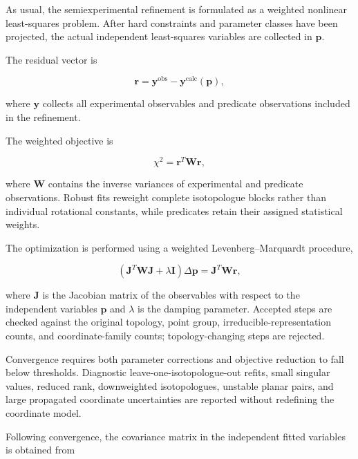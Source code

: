 \documentclass[aip,jcp,reprint,longbibliography,floatfix]{revtex4-2}
\begin{document}
As usual,\cite{Demaison2011EquilibriumStructures,Mendolicchio2017MSR} the semiexperimental
refinement is formulated as a weighted nonlinear least-squares problem.
After hard constraints and parameter classes have been projected, the actual independent
least-squares variables are collected in $\mathbf{p}$.

The residual vector is

\begin{equation}
\mathbf{r}
= \mathbf{y}^{\mathrm{obs}}
- \mathbf{y}^{\mathrm{calc}}(\mathbf{p}),
\end{equation}

where $\mathbf{y}$ collects all experimental observables and predicate
observations included in the refinement.

The weighted objective is

\begin{equation}
\chi^2
=
\mathbf{r}^{T}
\mathbf{W}
\mathbf{r},
\end{equation}

where $\mathbf{W}$ contains the inverse variances of experimental and predicate
observations. Robust fits reweight complete isotopologue blocks rather than
individual rotational constants, while predicates retain their assigned
statistical weights.

The optimization is performed using a weighted Levenberg--Marquardt procedure,

\begin{equation}
\left(
\mathbf{J}^{T}
\mathbf{W}
\mathbf{J}
+
\lambda \mathbf{I}
\right)
\Delta \mathbf{p}
=
\mathbf{J}^{T}
\mathbf{W}
\mathbf{r},
\label{eq:lm-step}
\end{equation}

where $\mathbf{J}$ is the Jacobian matrix of the observables with respect to
the independent variables $\mathbf{p}$ and $\lambda$ is the damping parameter.
Accepted steps are checked against the original topology, point group,
irreducible-representation counts, and coordinate-family counts; topology-changing
steps are rejected.

Convergence requires both parameter corrections and objective reduction to fall
below thresholds. Diagnostic leave-one-isotopologue-out refits, small singular
values, reduced rank, downweighted isotopologues, unstable planar pairs, and
large propagated coordinate uncertainties are reported without redefining the
coordinate model.

Following convergence, the covariance matrix in the independent fitted
variables is obtained from
\end{document}
